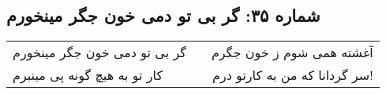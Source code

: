 \begin{center}
\section*{شماره ۳۵: گر بی تو دمی خون جگر مینخورم}
\label{sec:035}
\begin{longtable}{l p{0.5cm} r}
گر بی تو دمی خون جگر مینخورم
&&
آغشته همی شوم ز خون جگرم
\\
کار تو به هیچ گونه پی مینبرم
&&
سر گردانا که من به کارتو درم!
\\
\end{longtable}
\end{center}
